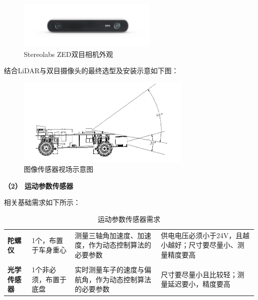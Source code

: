 \begin{figure}[H]
	\centering
	\includegraphics[width = 0.6\textwidth]{fig/zed.jpg}
	\caption{Stereolabs ZED双目相机外观}
	\label{zed}
\end{figure}

结合LiDAR与双目摄像头的最终选型及安装示意如下图：

\begin{figure}[H]
	\centering
	\includegraphics[width = 0.75\textwidth]{fig/sjyj.png}
	\caption{图像传感器视场示意图}
	\label{sjyj}
\end{figure}


\textbf{（2） 运动参数传感器}

相关基础需求如下所示：

\begin{table}[H]
	\centering%
	\caption[centering]{运动参数传感器需求}%
	\label{ydxq}%
	\begin{tabular}{C{2cm}C{3cm}p{3cm}p{4cm}}	
		\toprule
		 & & &\\ 
		\midrule
		
		\textbf{陀螺仪} & 1个，布置于车身重心 & 测量三轴角加速度、加速度，作为动态控制算法的必要参数 & 供电电压必须小于24V，且越小越好；尺寸要尽量小、测量精度要高 \\
		\\
		\textbf{光学传感器} & 1个非必须，布置于底盘 & 实时测量车子的速度与偏航角，作为动态控制算法的必要参数 & 尺寸要尽量小且比较轻；测量延迟要小，精度要高\\	
		
		\bottomrule
	\end{tabular}
\end{table}

